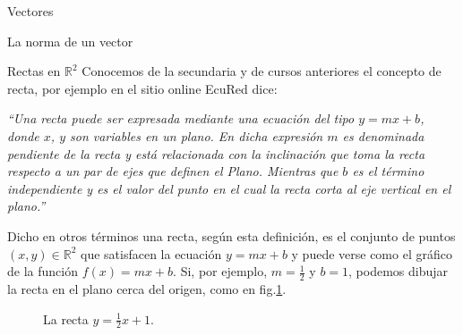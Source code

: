 \documentclass[a4paper,12pt,twoside,spanish,reqno]{amsbook}
\numberwithin{equation}{section}
\theoremstyle{definition}
\theoremstyle{remark}
\newcommand{\R}{\mathbb R}
\begin{document}
\begin{chapter}{Vectores}
\begin{section}{La norma de un vector}
    \end{section}

    \begin{section}{Rectas en $\R^2$}\label{seccion-rectas-en-r2}
    Conocemos de la secundaria y de cursos anteriores el concepto de recta, por ejemplo en el  sitio online EcuRed dice: 
    
    \textit{``Una recta puede ser expresada mediante una ecuación del tipo $y = m x + b$, donde $x$, $y$ son variables en un plano. En dicha expresión $m$ es denominada pendiente de la recta y está relacionada con la inclinación que toma la recta respecto a un par de ejes que definen el Plano. Mientras que $b$ es el término independiente y es el valor del punto en el cual la recta corta al eje vertical en el plano.''}
    
    Dicho en otros términos una recta,  según esta definición, es el conjunto de puntos $(x,y) \in \R^2$ que satisfacen la ecuación $y = m x + b$ y puede verse como el gráfico de la función $f(x) = m x + b$. Si, por ejemplo, $m=\frac12$ y $b=1$, podemos dibujar la recta en el plano cerca del origen, como en fig.\ref{fig-recta-funcion}.
    \begin{figure}[h]
        \caption{La recta $y = \frac12x +1$.}
        \label{fig-recta-funcion}
    \end{figure} 
    

\end{section}
\end{chapter}
\end{document}
